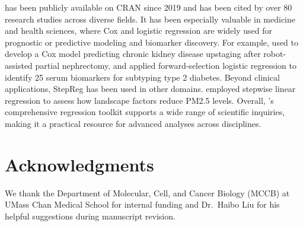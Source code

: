  has been publicly available on CRAN since 2019 and has been cited by over 80 research studies across diverse fields. It has been especially valuable in medicine and health sciences, where Cox and logistic regression are widely used for prognostic or predictive modeling and biomarker discovery. For example, \citet{RN34} used  to develop a Cox model predicting chronic kidney disease upstaging after robot-assisted partial nephrectomy, and \citet{RN49} applied forward-selection logistic regression to identify 25 serum biomarkers for subtyping type 2 diabetes. Beyond clinical applications, StepReg has been used in other domains. \citet{RN59} employed stepwise linear regression to assess how landscape factors reduce PM2.5 levels. Overall, 's comprehensive regression toolkit supports a wide range of scientific inquiries, making it a practical resource for advanced analyses across disciplines.

\section{Acknowledgments}\label{acknowledgments}

We thank the Department of Molecular, Cell, and Cancer Biology (MCCB) at UMass Chan Medical School for internal funding and Dr.~Haibo Liu for his helpful suggestions during manuscript revision.



\address{%
Junhui Li\\
University of Massachusetts Chan Medical School\\%
Department of Molecular, Cell, and Cancer Biology\\ University of Massachusetts Chan Medical School\\ Worcester, MA, USA, 01605\\
%
%
\textit{ORCiD: \href{https://orcid.org/0000-0003-3973-1700}{0000-0003-3973-1700}}\\%
\href{mailto:junhui.li11@umassmed.edu}{\nolinkurl{junhui.li11@umassmed.edu}}%
}

\address{%
Kai Hu\\
University of Massachusetts Chan Medical School\\%
Department of Molecular, Cell, and Cancer Biology\\ University of Massachusetts Chan Medical School\\ Worcester, MA, USA, 01605\\
%
%
%
%
}


